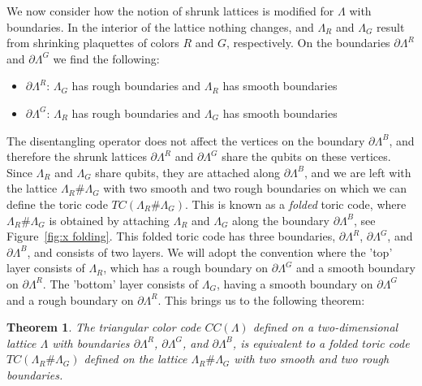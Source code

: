 \documentclass[12pt]{article}
\newtheorem{theorem}{Theorem}[section]
\theoremstyle{definition}
\begin{document}
We now consider how the notion of shrunk lattices is modified for $\Lambda$ with boundaries. In the interior of the lattice nothing changes, and $\Lambda_R$ and $\Lambda_G$ result from shrinking plaquettes of colors $R$ and $G$, respectively. On the boundaries $\partial\Lambda^R$ and $\partial\Lambda^G$ we find the following:
    \begin{itemize}
        \item \textbf{$\partial\Lambda^R$}: $\Lambda_G$ has rough boundaries and $\Lambda_R$ has smooth boundaries
        \item \textbf{$\partial\Lambda^G$}: $\Lambda_R$ has rough boundaries and $\Lambda_G$ has smooth boundaries
    \end{itemize}
The disentangling operator does not affect the vertices on the boundary $\partial\Lambda^B$, and therefore the shrunk lattices $\partial\Lambda^R$ and $\partial\Lambda^G$ share the qubits on these vertices. Since $\Lambda_R$ and $\Lambda_G$ share qubits, they are attached along $\partial\Lambda^B$, and we are left with the lattice $\Lambda_R\#\Lambda_G$ with two smooth and two rough boundaries on which we can define the toric code $TC(\Lambda_R\#\Lambda_G)$. This is known as a \emph{folded} toric code, where $\Lambda_R\#\Lambda_G$ is obtained by attaching $\Lambda_R$ and $\Lambda_G$ along the boundary $\partial\Lambda^B$, see Figure~\ref{fig:x folding}. This folded toric code has three boundaries, $\partial\Lambda^R$, $\partial\Lambda^G$, and $\partial\Lambda^B$, and consists of two layers. We will adopt the convention where the 'top' layer consists of $\Lambda_R$, which has a rough boundary on $\partial\Lambda^G$ and a smooth boundary on $\partial\Lambda^R$. The 'bottom' layer consists of $\Lambda_G$, having a smooth boundary on $\partial\Lambda^G$ and a rough boundary on $\partial\Lambda^R$. This brings us to the following theorem:
    \begin{theorem}
        The triangular color code $CC(\Lambda)$ defined on a two-dimensional lattice $\Lambda$ with boundaries $\partial\Lambda^R$, $\partial\Lambda^G$, and $\partial\Lambda^B$, is equivalent to a folded toric code $TC(\Lambda_R\#\Lambda_G)$ defined on the lattice $\Lambda_R\#\Lambda_G$ with two smooth and two rough boundaries.
    \end{theorem}
\end{document}
